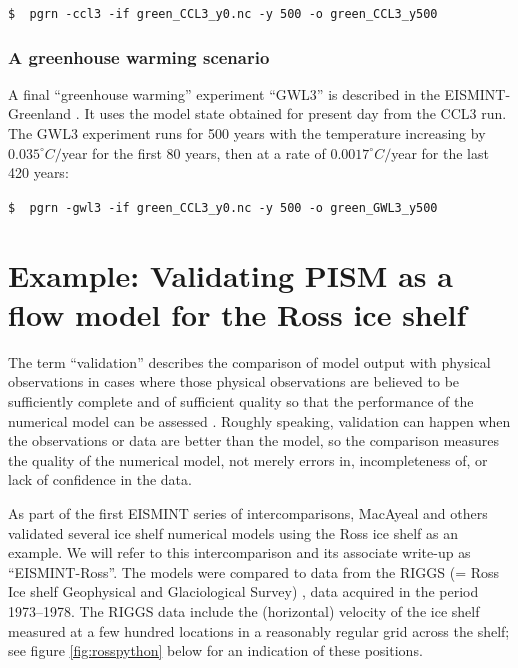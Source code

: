 \documentclass[11pt,final]{amsart}
\begin{document}
\verb|$  pgrn -ccl3 -if green_CCL3_y0.nc -y 500 -o green_CCL3_y500|


\subsubsection*{A greenhouse warming scenario}  A final ``greenhouse warming'' experiment ``GWL3'' is described in the EISMINT-Greenland \cite{RitzEISMINT}.  It uses the model state obtained for present day from the CCL3 run.  The GWL3 experiment  runs for 500 years with the temperature increasing by $0.035^\circ C/$year for the first 80 years, then at a rate of $0.0017^\circ C/$year for the last 420 years:

\verb|$  pgrn -gwl3 -if green_CCL3_y0.nc -y 500 -o green_GWL3_y500|



\clearpage\newpage
\section{Example: Validating PISM as a flow model for the Ross ice shelf}\label{sect:ross}     The term ``validation'' describes the comparison of model output with physical observations in cases where those physical observations are believed to be sufficiently complete and of sufficient quality so that the performance of the numerical model can be assessed \cite{Roache,Wesseling}.  Roughly speaking, validation can happen when the observations or data are better than the model, so the comparison measures the quality of the numerical model, not merely errors in, incompleteness of, or lack of confidence in the data.

As part of the first EISMINT series of intercomparisons, MacAyeal and others \cite{MacAyealetal} validated several ice shelf numerical models using the Ross ice shelf as an example.  We will refer to this intercomparison and its associate write-up \cite{MacAyealetal} as ``EISMINT-Ross''.  The models were compared to data from the RIGGS (= Ross Ice shelf Geophysical and Glaciological Survey) \cite{RIGGS2,RIGGS1}, data acquired in the period 1973--1978.   The RIGGS data include the (horizontal) velocity of the ice shelf measured at a few hundred locations in a reasonably regular grid across the shelf; see figure \ref{fig:rosspython} below for an indication of these positions.
\end{document}
